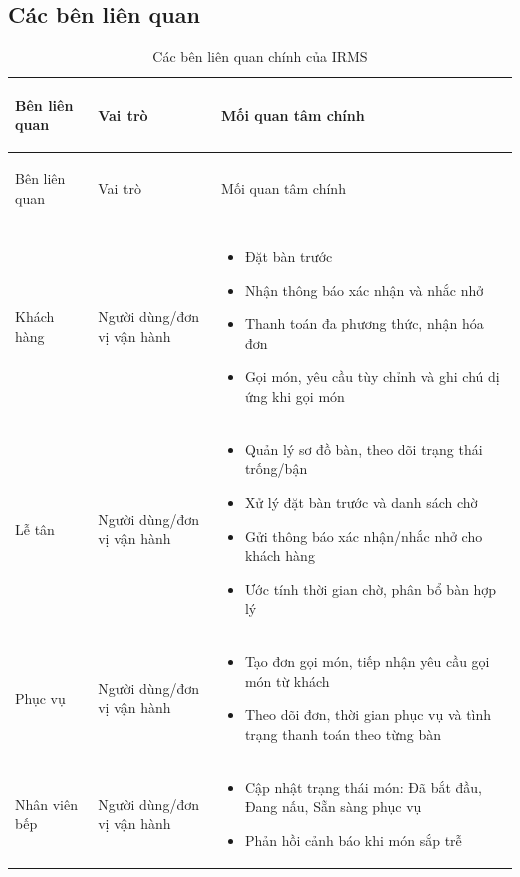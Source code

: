 \subsection{Các bên liên quan}
\begin{longtable}{>{\bfseries\raggedright\arraybackslash}p{2.4cm} >{\bfseries\raggedright\arraybackslash}p{2.8cm} >{\raggedright\arraybackslash}p{9.4cm}}
\caption{Các bên liên quan chính của IRMS}\\
\toprule
Bên liên quan & Vai trò & Mối quan tâm chính \\
\midrule
\endfirsthead
\toprule
Bên liên quan & Vai trò & Mối quan tâm chính \\
\midrule
\endhead
\midrule
\multicolumn{3}{r}{\footnotesize Tiếp tục ở trang sau}\\
\endfoot
\bottomrule
\endlastfoot
Khách hàng & Người dùng/đơn vị vận hành & \begin{itemize}
  \item Đặt bàn trước
  \item Nhận thông báo xác nhận và nhắc nhở
  \item Thanh toán đa phương thức, nhận hóa đơn
  \item Gọi món, yêu cầu tùy chỉnh và ghi chú dị ứng khi gọi món
\end{itemize} \\
Lễ tân & Người dùng/đơn vị vận hành & \begin{itemize}
  \item Quản lý sơ đồ bàn, theo dõi trạng thái trống/bận
  \item Xử lý đặt bàn trước và danh sách chờ
  \item Gửi thông báo xác nhận/nhắc nhở cho khách hàng
  \item Ước tính thời gian chờ, phân bổ bàn hợp lý
\end{itemize} \\
Phục vụ & Người dùng/đơn vị vận hành & \begin{itemize}
  \item Tạo đơn gọi món, tiếp nhận yêu cầu gọi món từ khách
  \item Theo dõi đơn, thời gian phục vụ và tình trạng thanh toán theo từng bàn
\end{itemize} \\
Nhân viên bếp & Người dùng/đơn vị vận hành & \begin{itemize}
  \item Cập nhật trạng thái món: Đã bắt đầu, Đang nấu, Sẵn sàng phục vụ
  \item Phản hồi cảnh báo khi món sắp trễ

\end{itemize}
\end{longtable}
